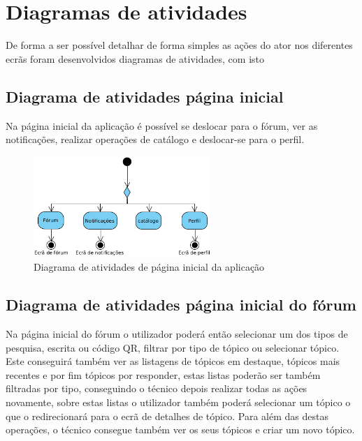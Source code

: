 \section{Diagramas de atividades}
De forma a ser possível detalhar de forma simples as ações do ator nos diferentes ecrãs foram 
desenvolvidos diagramas de atividades, com isto 

\subsection{Diagrama de atividades página inicial}

Na página inicial da aplicação é possível se deslocar para o fórum, ver as notificações, realizar operações
de catálogo e deslocar-se para o perfil.

\begin{figure}[htb]
    \centering
    \includegraphics[width=0.6\textwidth]{images/diagramas/atividades/diagrama_atividades_home.png}
    \caption{Diagrama de atividades de página inicial da aplicação}
    \label{fig:22}
\end{figure}

\newpage

\subsection{Diagrama de atividades página inicial do fórum}

Na página inicial do fórum o utilizador poderá então selecionar um dos tipos de pesquisa, escrita 
ou código QR, filtrar por tipo de tópico ou selecionar tópico. Este conseguirá também ver as 
listagens de tópicos em destaque, tópicos mais recentes e por fim tópicos por 
responder, estas listas poderão ser também filtradas por tipo, conseguindo o 
técnico depois realizar todas as ações novamente, sobre estas listas o utilizador também poderá 
selecionar um tópico o que o redirecionará para o ecrã de detalhes de tópico. Para além das 
destas operações, o técnico consegue também ver os seus tópicos e criar um novo tópico.

